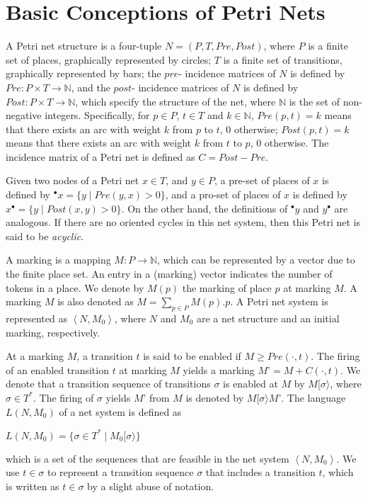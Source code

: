 \documentclass{article}
\begin{document}

\section{Basic Conceptions of Petri Nets}
A Petri net structure is a four-tuple $N=(P,T,Pre,Post)$, where $P$ is a finite set of places, graphically represented by circles; $T$ is a finite set of transitions, graphically represented by bars; the $pre$- incidence matrices of $N$ is defined by $Pre: P \times T \to \mathbb{N}$, and the $post$- incidence matrices of $N$ is defined by $Post: P\times T \to\mathbb{N}$, which specify the structure of the net, where $ \mathbb{N} $ is the set of non-negative integers. Specifically, for $p\in P$, $t\in T$ and $k\in \mathbb{N}$, $Pre(p,t)=k$ means that there exists an arc with weight $k$ from $ p $ to $ t $, 0 otherwise; $Post(p,t)=k$ means that there exists an arc with weight $k$ from $ t $ to $ p $, 0 otherwise. The incidence matrix of a Petri net is defined as $C=Post-Pre$.
	
Given two nodes of a Petri net $x\in T$, and $y\in P$, a pre-set of places of $x$ is defined by $^\bullet x=\{y \mid Pre(y,x)>0\}$, and a pro-set of places of $x$ is defined by $x^\bullet=\{y \mid Post(x,y)>0\}$. On the other hand, the definitions of $^\bullet y$ and $y^\bullet $ are analogous. If there are no oriented cycles in this net system, then this Petri net is said to be {\it acyclic}.
	
A marking is a mapping $M\colon P\to\mathbb{N}$, which can be represented by a vector due to the finite place set. An entry in a (marking) vector indicates the number of tokens in a place. We denote by $M(p)$ the marking of place $p$ at marking $M$. A marking $M$ is also denoted as $M=\sum_{p\in P}M(p).p$. A Petri net system is represented as $\left\langle N, M_0\right\rangle$, where $N$ and $M_0$ are a net structure and an initial marking, respectively.
	
At a marking $M$, a transition $t$ is said to be enabled if $M\geq Pre(\cdot,t)$. The firing of an enabled transition $t$ at marking $M$ yields a marking $M’= M+C(\cdot,t)$. We denote that a transition sequence of transitions $\sigma$ is enabled at $M$ by $M[\sigma\rangle$, where $\sigma\in T^*$. The firing of $\sigma$ yields $M’$ from $M$ is denoted by $M[\sigma\rangle M’$. The language $L(N, M_0)$ of a net system is defined as
	 \begin{center}
	 	$L(N, M_0)=\{\sigma\in T^*\mid M_0[\sigma\rangle\} $
	 \end{center}
which is a set of the sequences that are feasible in the net system $\left \langle N, M_0 \right\rangle$. We use $t\in\sigma$ to represent a transition sequence $\sigma$ that includes a transition $t$, which is written as $t\in\sigma$ by a slight abuse of notation. %
 
\end{document}
